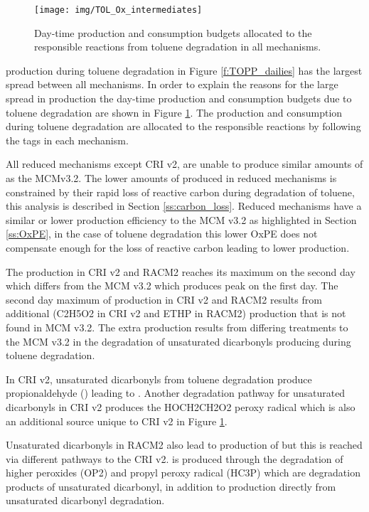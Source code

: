 \begin{figure}
    \centering
    \texttt{[image: img/TOL\_Ox\_intermediates]}
    \vspace{0mm}
    \caption{Day-time  production and consumption budgets allocated to the responsible reactions from toluene degradation in all mechanisms.}
    \vspace{-4mm}
    \label{f:toluene_Ox}
\end{figure}

 production during toluene degradation in Figure \ref{f:TOPP_dailies} has the largest spread between all mechanisms.
In order to explain the reasons for the large spread in  production the day-time  production and consumption budgets due to toluene degradation are shown in Figure \ref{f:toluene_Ox}.
The  production and consumption during toluene degradation are allocated to the responsible reactions by following the tags in each mechanism.

All reduced mechanisms except CRI v2, are unable to produce similar amounts of  as the MCMv3.2.
The lower amounts of  produced in reduced mechanisms is constrained by their rapid loss of reactive carbon during degradation of toluene, this analysis is described in Section \ref{ss:carbon_loss}.
Reduced mechanisms have a similar or lower  production efficiency to the MCM v3.2 as highlighted in Section \ref{ss:OxPE}, in the case of toluene degradation this lower OxPE does not compensate enough for the loss of reactive carbon leading to lower  production.

The  production in CRI v2 and RACM2 reaches its maximum on the second day which differs from the MCM v3.2 which produces peak  on the first day.
The second day maximum of  production in CRI v2 and RACM2 results from additional  (C2H5O2 in CRI v2 and ETHP in RACM2) production that is not found in MCM v3.2.
The extra  production results from differing treatments to the MCM v3.2 in the degradation of unsaturated dicarbonyls producing during toluene degradation.

In CRI v2, unsaturated dicarbonyls from toluene degradation produce propionaldehyde () leading to .
Another degradation pathway for unsaturated dicarbonyls in CRI v2 produces the HOCH2CH2O2 peroxy radical which is also an additional  source unique to CRI v2 in Figure \ref{f:toluene_Ox}.

Unsaturated dicarbonyls in RACM2 also lead to production of  but this is reached via different pathways to the CRI v2.
 is produced through the degradation of higher peroxides (OP2) and propyl peroxy radical (HC3P) which are degradation products of unsaturated dicarbonyl, in addition to  production directly from unsaturated dicarbonyl degradation.

